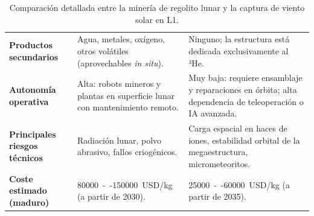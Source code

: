 \documentclass[11pt,a4paper]{article}
\begin{document}
\begin{table}[H]
\begin{tabularx}{\textwidth}{l X X}
\addlinespace
\textbf{Productos secundarios} & Agua, metales, oxígeno, otros volátiles (aprovechables \textit{in situ}). & Ninguno; la estructura está dedicada exclusivamente al ³He. \\
\addlinespace
\textbf{Autonomía operativa} & Alta: robots mineros y plantas en superficie lunar con mantenimiento remoto. & Muy baja: requiere ensamblaje y reparaciones en órbita; alta dependencia de teleoperación o IA avanzada. \\
\addlinespace
\textbf{Principales riesgos técnicos} & Radiación lunar, polvo abrasivo, fallos criogénicos. & Carga espacial en haces de iones, estabilidad orbital de la megaestructura, micrometeoritos. \\
\addlinespace
\textbf{Coste estimado (maduro)} & \SI{80000}{--}\SI{150000}{USD/kg} (a partir de 2030). & \SI{25000}{--}\SI{60000}{USD/kg} (a partir de 2035). \\
\bottomrule
\end{tabularx}
\caption{Comparación detallada entre la minería de regolito lunar y la captura de viento solar en L1.}
\label{tab:comparativa}
\end{table}
\end{document}
